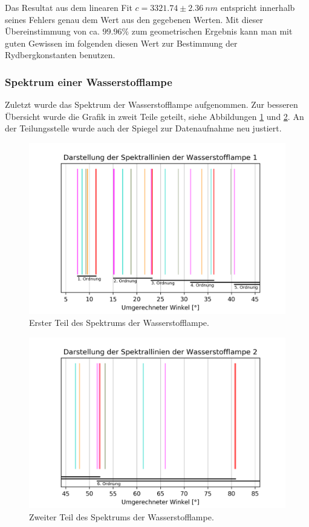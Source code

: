 \documentclass[]{article}
\begin{document}
Das Resultat aus dem linearen Fit $c = 3321.74 \pm 2.36 \: nm$ entspricht innerhalb seines Fehlers genau dem Wert aus den gegebenen Werten. Mit dieser Übereinstimmung von ca. $99.96\%$ zum geometrischen Ergebnis kann man mit guten Gewissen im folgenden diesen Wert zur Bestimmung der Rydbergkonstanten benutzen.

\subsubsection{Spektrum einer Wasserstofflampe}
Zuletzt wurde das Spektrum der Wasserstofflampe aufgenommen. Zur besseren Übersicht wurde die Grafik in zweit Teile geteilt, siehe Abbildungen \ref{fig:H Lines 0} und \ref{fig:H Lines 1}. An der Teilungsstelle wurde auch der Spiegel zur Datenaufnahme neu justiert. 

\begin{figure}[H]
\centering
\includegraphics[width=1\textwidth]{Plots/HD_Linien_0.png}
\caption{ Erster Teil des Spektrums der Wasserstofflampe. }
\label{fig:H Lines 0}
\end{figure}

\begin{figure}[H]
\centering
\includegraphics[width=1\textwidth]{Plots/HD_Linien_1.png}
\caption{ Zweiter Teil des Spektrums der Wasserstofflampe.}
\label{fig:H Lines 1}
\end{figure}
\mbox \\
\end{document}
